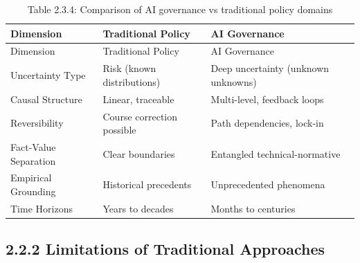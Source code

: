\documentclass[
  11pt,
  letterpaper,
  openany]{book}
\begin{document}
\begin{longtable}[]{@{}
  >{\raggedright\arraybackslash}p{}
  >{\raggedright\arraybackslash}p{}
  >{\raggedright\arraybackslash}p{}@{}}
\caption{Table 2.3.4: Comparison of AI governance vs traditional policy
domains}\label{tbl-governance-challenges}\tabularnewline
\toprule\noalign{}
\begin{minipage}[b]{\linewidth}\raggedright
Dimension
\end{minipage} & \begin{minipage}[b]{\linewidth}\raggedright
Traditional Policy
\end{minipage} & \begin{minipage}[b]{\linewidth}\raggedright
AI Governance
\end{minipage} \\
\midrule\noalign{}
\endfirsthead
\toprule\noalign{}
\begin{minipage}[b]{\linewidth}\raggedright
Dimension
\end{minipage} & \begin{minipage}[b]{\linewidth}\raggedright
Traditional Policy
\end{minipage} & \begin{minipage}[b]{\linewidth}\raggedright
AI Governance
\end{minipage} \\
\midrule\noalign{}
\endhead
\bottomrule\noalign{}
\endlastfoot
Uncertainty Type & Risk (known distributions) & Deep uncertainty
(unknown unknowns) \\
Causal Structure & Linear, traceable & Multi-level, feedback loops \\
Reversibility & Course correction possible & Path dependencies,
lock-in \\
Fact-Value Separation & Clear boundaries & Entangled
technical-normative \\
Empirical Grounding & Historical precedents & Unprecedented phenomena \\
Time Horizons & Years to decades & Months to centuries \\
\end{longtable}

\subsection{2.2.2 Limitations of Traditional
Approaches}\label{limitations-of-traditional-approaches}
\end{document}
